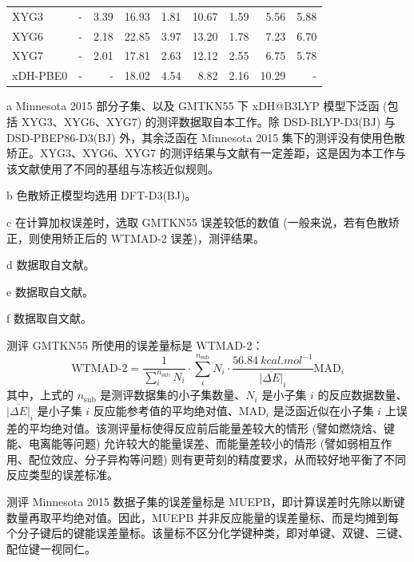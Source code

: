 \begin{table}
{\begin{tabular}{ld{1.3}d{1.3}d{2.2}d{2.2}d{2.2}d{2.2}d{2.2}d{2.2}}
  XYG3            
  & -               & 3.39 & 16.93      & 1.81        & 10.67      & 1.59       & 5.56       & 5.88     \\
  XYG6            
  & -               & 2.18 & 22.85      & 3.97        & 13.20      & 1.78       & 7.23       & 6.70     \\
  XYG7            
  & -               & 2.01 & 17.81      & 2.63        & 12.12      & 2.55       & 6.75       & 5.78     \\
  xDH-PBE0        
  & -               & -               & 18.02      & 4.54        & 8.82       & 2.16       & 10.29      & -        \\
  \bottomrule
  \end{tabular}
}{
  \item[a] Minnesota 2015 部分子集、以及 GMTKN55 下 xDH@B3LYP 模型下泛函 (包括 XYG3、XYG6、XYG7) 的测评数据取自本工作。除 DSD-BLYP-D3(BJ) 与 DSD-PBEP86-D3(BJ) 外，其余泛函在 Minnesota 2015 集下的测评没有使用色散矫正。XYG3、XYG6、XYG7 的测评结果与文献\cite{Zhang-Xu.JPCL.2021}有一定差距，这是因为本工作与该文献使用了不同的基组与冻核近似规则。
  \item[b] 色散矫正模型均选用 DFT-D3(BJ)。
  \item[c] 在计算加权误差时，选取 GMTKN55 误差较低的数值 (一般来说，若有色散矫正，则使用矫正后的 WTMAD-2 误差)，测评结果。
  \item[d] 数据取自文献\cite{Goerigk-Grimme.PCCP.2017}。
  \item[e] 数据取自文献\cite{Mehta-Goerigk.PCCP.2018}。
  \item[f] 数据取自文献\cite{Santra-Martin.JPCA.2019}。
}
\end{table}

测评 GMTKN55 所使用的误差量标是 WTMAD-2：
\begin{equation}
  \text{WTMAD-2} = \frac{1}{\sum_{i}^{n_\mathrm{sub}} N_i} \cdot \sum_{i}^{n_\mathrm{sub}} N_i \cdot \frac{\SI{56.84}{kcal.mol^{-1}}}{\overline{|\Delta E|}_i} \text{MAD}_i
\end{equation}
其中，上式的 $n_\mathrm{sub}$ 是测评数据集的小子集数量、$N_i$ 是小子集 $i$ 的反应数据数量、$\overline{|\Delta E|}_i$ 是小子集 $i$ 反应能参考值的平均绝对值、$\text{MAD}_i$ 是泛函近似在小子集 $i$ 上误差的平均绝对值。该测评量标使得反应前后能量差较大的情形 (譬如燃烧焓、键能、电离能等问题) 允许较大的能量误差、而能量差较小的情形 (譬如弱相互作用、配位效应、分子异构等问题) 则有更苛刻的精度要求，从而较好地平衡了不同反应类型的误差标准。

测评 Minnesota 2015 数据子集的误差量标是 MUEPB，即计算误差时先除以断键数量再取平均绝对值。因此，MUEPB 并非反应能量的误差量标、而是均摊到每个分子键后的键能误差量标。该量标不区分化学键种类，即对单键、双键、三键、配位键一视同仁。


